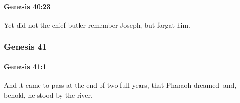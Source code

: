 		\paragraph{Genesis 40:23} %
			\label{GENESIS-40-23}

			Yet did not the chief butler remember Joseph, but forgat him.

	\subsubsection{Genesis 41} %
		\label{GENESIS-41}

		\paragraph{Genesis 41:1} %
			\label{GENESIS-41-1}

			And it came to pass at the end of two full years, that Pharaoh dreamed: and, behold, he stood by the river.

